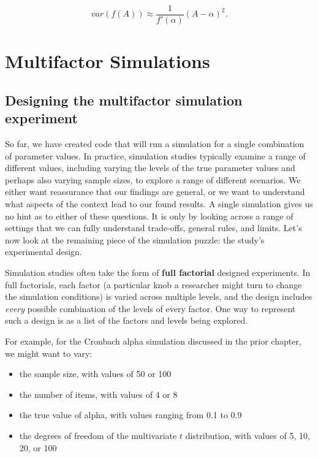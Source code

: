 \documentclass[
]{book}
\providecommand{\tightlist}{%
  \setlength{\itemsep}{0pt}\setlength{\parskip}{0pt}}
\begin{document}
\[ var( f(A) ) \approx \frac{1}{f'(\alpha)} (A - \alpha)^2 . \]

\part{Multifactor Simulations}\label{part-multifactor-simulations}

\chapter{Designing the multifactor simulation experiment}\label{exp-design}

So far, we have created code that will run a simulation for a single combination of parameter values.
In practice, simulation studies typically examine a range of different values, including varying the levels of the true parameter values and perhaps also varying sample sizes, to explore a range of different scenarios.
We either want reassurance that our findings are general, or we want to understand what aspects of the context lead to our found results.
A single simulation gives us no hint as to either of these questions.
It is only by looking across a range of settings that we can fully understand trade-offs, general rules, and limits.
Let's now look at the remaining piece of the simulation puzzle: the study's experimental design.

Simulation studies often take the form of \textbf{full factorial} designed experiments. In full factorials, each factor (a particular knob a researcher might turn to change the simulation conditions) is varied across multiple levels, and the design includes \emph{every} possible combination of the levels of every factor. One way to represent such a design is as a list of the factors and levels being explored.

For example, for the Cronbach alpha simulation discussed in the prior chapter, we might want to vary:

\begin{itemize}
\tightlist
\item
  the sample size, with values of 50 or 100
\item
  the number of items, with values of 4 or 8
\item
  the true value of alpha, with values ranging from 0.1 to 0.9
\item
  the degrees of freedom of the multivariate \(t\) distribution, with values of 5, 10, 20, or 100
\end{itemize}
\end{document}
